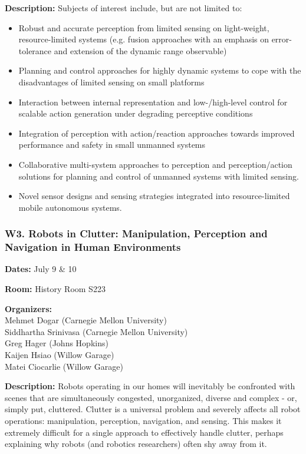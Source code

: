 \bigskip
{\bf Description:}
Subjects of interest include, but are not limited to:
\begin{itemize}
\item Robust and accurate perception from limited sensing on light-weight, resource-limited systems (e.g. fusion approaches with an emphasis on error-tolerance and extension of the dynamic range observable)
\item Planning and control approaches for highly dynamic systems to cope with the disadvantages of limited sensing on small platforms
\item Interaction between internal representation and low-/high-level control for scalable action generation under degrading perceptive conditions
\item Integration of perception with action/reaction approaches towards improved performance and safety in small unmanned systems
\item Collaborative multi-system approaches to perception and perception/action solutions for planning and control of unmanned systems with limited sensing.
\item Novel sensor designs and sensing strategies integrated into resource-limited mobile autonomous systems.

\end{itemize}


\subsubsection*{W3.  Robots in Clutter: Manipulation, Perception and Navigation in Human Environments}

{\bf Dates:} July 9 \& 10

{\bf Room:} History Room S223

\bigskip
{\bf Organizers:}\\
Mehmet Dogar (Carnegie Mellon University)\\
Siddhartha Srinivasa (Carnegie Mellon University)\\
Greg Hager (Johns Hopkins)\\
Kaijen Hsiao (Willow Garage)\\
Matei Ciocarlie (Willow Garage)

\bigskip
{\bf Description:}
Robots operating in our homes will inevitably be confronted with scenes that are simultaneously congested, unorganized, diverse and complex - or, simply put, cluttered. Clutter is a universal problem and severely affects all robot operations: manipulation, perception, navigation, and sensing. This makes it extremely difficult for a single approach to effectively handle clutter, perhaps explaining why robots (and robotics researchers) often shy away from it. 

